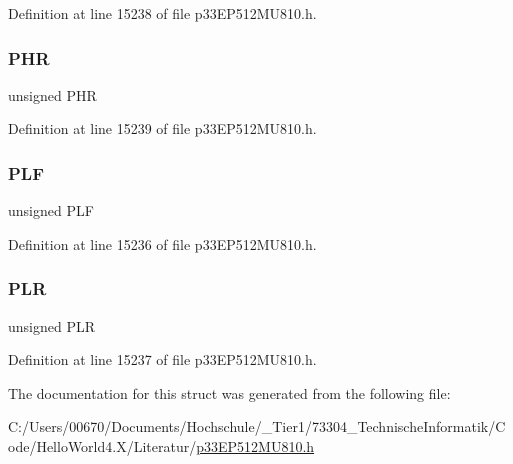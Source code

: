 Definition at line 15238 of file p33\+E\+P512\+M\+U810.\+h.

\mbox{\label{structtag_l_e_b_c_o_n5_b_i_t_s_ae02a9c6926c3a1feac21cec18a520e4a}} 
\subsubsection{\texorpdfstring{P\+HR}{PHR}}
{\footnotesize\ttfamily unsigned P\+HR}



Definition at line 15239 of file p33\+E\+P512\+M\+U810.\+h.

\mbox{\label{structtag_l_e_b_c_o_n5_b_i_t_s_ab72be8b35e01107182afb8e9733d72bb}} 
\subsubsection{\texorpdfstring{P\+LF}{PLF}}
{\footnotesize\ttfamily unsigned P\+LF}



Definition at line 15236 of file p33\+E\+P512\+M\+U810.\+h.

\mbox{\label{structtag_l_e_b_c_o_n5_b_i_t_s_a5f690459b53fc81b46dbbac226cecb25}} 
\subsubsection{\texorpdfstring{P\+LR}{PLR}}
{\footnotesize\ttfamily unsigned P\+LR}



Definition at line 15237 of file p33\+E\+P512\+M\+U810.\+h.



The documentation for this struct was generated from the following file\+:\begin{DoxyCompactItemize}
\item 
C\+:/\+Users/00670/\+Documents/\+Hochschule/\+\_\+\+Tier1/73304\+\_\+\+Technische\+Informatik/\+Code/\+Hello\+World4.\+X/\+Literatur/\hyperlink{p33_e_p512_m_u810_8h}{p33\+E\+P512\+M\+U810.\+h}\end{DoxyCompactItemize}
